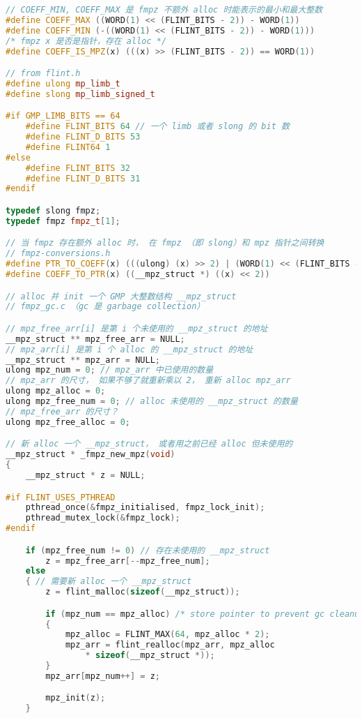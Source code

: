 \begin{lstlisting}[language=cpp]
// COEFF_MIN, COEFF_MAX 是 fmpz 不额外 alloc 时能表示的最小和最大整数
#define COEFF_MAX ((WORD(1) << (FLINT_BITS - 2)) - WORD(1))
#define COEFF_MIN (-((WORD(1) << (FLINT_BITS - 2)) - WORD(1)))
/* fmpz x 是否是指针，存在 alloc */
#define COEFF_IS_MPZ(x) (((x) >> (FLINT_BITS - 2)) == WORD(1))

// from flint.h
#define ulong mp_limb_t
#define slong mp_limb_signed_t

#if GMP_LIMB_BITS == 64
    #define FLINT_BITS 64 // 一个 limb 或者 slong 的 bit 数
    #define FLINT_D_BITS 53
    #define FLINT64 1
#else 
    #define FLINT_BITS 32
    #define FLINT_D_BITS 31
#endif

typedef slong fmpz;
typedef fmpz fmpz_t[1];

// 当 fmpz 存在额外 alloc 时， 在 fmpz （即 slong）和 mpz 指针之间转换
// fmpz-conversions.h
#define PTR_TO_COEFF(x) (((ulong) (x) >> 2) | (WORD(1) << (FLINT_BITS - 2)))
#define COEFF_TO_PTR(x) ((__mpz_struct *) ((x) << 2))

// alloc 并 init 一个 GMP 大整数结构 __mpz_struct
// fmpz_gc.c （gc 是 garbage collection）

// mpz_free_arr[i] 是第 i 个未使用的 __mpz_struct 的地址
__mpz_struct ** mpz_free_arr = NULL;
// mpz_arr[i] 是第 i 个 alloc 的 __mpz_struct 的地址
__mpz_struct ** mpz_arr = NULL;
ulong mpz_num = 0; // mpz_arr 中已使用的数量
// mpz_arr 的尺寸， 如果不够了就重新乘以 2， 重新 alloc mpz_arr
ulong mpz_alloc = 0;
ulong mpz_free_num = 0; // alloc 未使用的 __mpz_struct 的数量
// mpz_free_arr 的尺寸？
ulong mpz_free_alloc = 0;

// 新 alloc 一个 __mpz_struct， 或者用之前已经 alloc 但未使用的
__mpz_struct * _fmpz_new_mpz(void)
{
    __mpz_struct * z = NULL;

#if FLINT_USES_PTHREAD
    pthread_once(&fmpz_initialised, fmpz_lock_init);
    pthread_mutex_lock(&fmpz_lock);
#endif

    if (mpz_free_num != 0) // 存在未使用的 __mpz_struct
        z = mpz_free_arr[--mpz_free_num];
    else
    { // 需要新 alloc 一个 __mpz_struct
        z = flint_malloc(sizeof(__mpz_struct));

        if (mpz_num == mpz_alloc) /* store pointer to prevent gc cleanup */
        {
            mpz_alloc = FLINT_MAX(64, mpz_alloc * 2);
            mpz_arr = flint_realloc(mpz_arr, mpz_alloc
                * sizeof(__mpz_struct *));
        }
        mpz_arr[mpz_num++] = z;

        mpz_init(z);
    }


\end{lstlisting}
